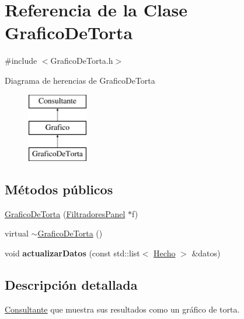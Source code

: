 \hypertarget{classGraficoDeTorta}{\section{\-Referencia de la \-Clase \-Grafico\-De\-Torta}
\label{classGraficoDeTorta}
}


{\ttfamily \#include $<$\-Grafico\-De\-Torta.\-h$>$}

\-Diagrama de herencias de \-Grafico\-De\-Torta\begin{figure}[H]
\begin{center}
\leavevmode
\includegraphics[height=3.000000cm]{classGraficoDeTorta}
\end{center}
\end{figure}
\subsection*{\-Métodos públicos}
\begin{DoxyCompactItemize}
\item 
\hyperlink{classGraficoDeTorta_aabb1e17113cca604d6685fd5d6b0b4be}{\-Grafico\-De\-Torta} (\hyperlink{classFiltradoresPanel}{\-Filtradores\-Panel} $\ast$f)
\item 
virtual \hyperlink{classGraficoDeTorta_acc7233c20887e55613c74dcd5ba26580}{$\sim$\-Grafico\-De\-Torta} ()
\item 
\hypertarget{classGraficoDeTorta_acf701899bc212c273f6ec0db717188c4}{void {\bfseries actualizar\-Datos} (const std\-::list$<$ \hyperlink{classHecho}{\-Hecho} $>$ \&datos)}\label{classGraficoDeTorta_acf701899bc212c273f6ec0db717188c4}

\end{DoxyCompactItemize}


\subsection{\-Descripción detallada}
\hyperlink{classConsultante}{\-Consultante} que muestra sus resultados como un gráfico de torta. 

